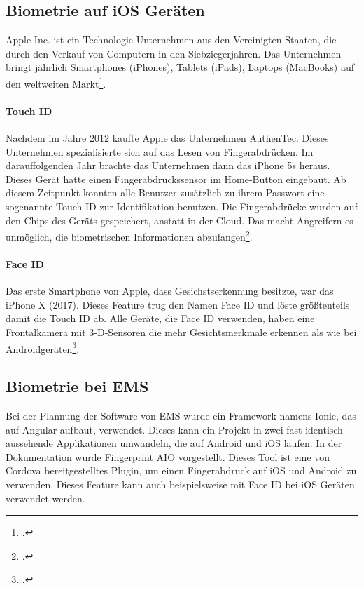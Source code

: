 \subsection{Biometrie auf iOS Geräten}
Apple Inc. ist ein Technologie Unternehmen aus den Vereinigten Staaten, die durch den Verkauf von Computern in den Siebziegerjahren. Das Unternehmen bringt jährlich Smartphones (iPhones), Tablets (iPads), Laptops (MacBooks) auf den weltweiten Markt\footcite{apple}.
\paragraph{Touch ID}
Nachdem im Jahre 2012 kaufte Apple das Unternehmen AuthenTec. Dieses Unternehmen spezialisierte sich auf das Lesen von Fingerabdrücken.
Im darauffolgenden Jahr brachte das Unternehmen dann das iPhone 5s heraus. Dieses Gerät hatte einen Fingerabdruckssensor im Home-Button eingebaut. Ab diesem Zeitpunkt konnten alle Benutzer zusätzlich zu ihrem Passwort eine sogenannte Touch ID zur Identifikation benutzen.
Die Fingerabdrücke wurden auf den Chips des Geräts gespeichert, anstatt in der Cloud. Das macht Angreifern es unmöglich, die biometrischen Informationen abzufangen\footcite{touchid}.

\paragraph{Face ID}
Das erste Smartphone von Apple, dass Gesichstserkennung besitzte, war das iPhone X (2017). Dieses Feature trug den Namen Face ID und löste größtenteils damit die Touch ID ab.
Alle Geräte, die Face ID verwenden, haben eine Frontalkamera mit 3-D-Sensoren die mehr Gesichtsmerkmale erkennen als wie bei Androidgeräten\footcite{faceid}.


\subsection{Biometrie bei EMS}
Bei der Plannung der Software von EMS wurde ein Framework namens Ionic, das auf Angular aufbaut, verwendet. Dieses kann ein Projekt in zwei fast identisch aussehende Applikationen umwandeln, die auf Android und iOS laufen.
In der Dokumentation wurde Fingerprint AIO vorgestellt. Dieses Tool ist eine von Cordova bereitgestelltes Plugin, um einen Fingerabdruck auf iOS und Android zu verwenden.
Dieses Feature kann auch beispielsweise mit Face ID bei iOS Geräten verwendet werden.

